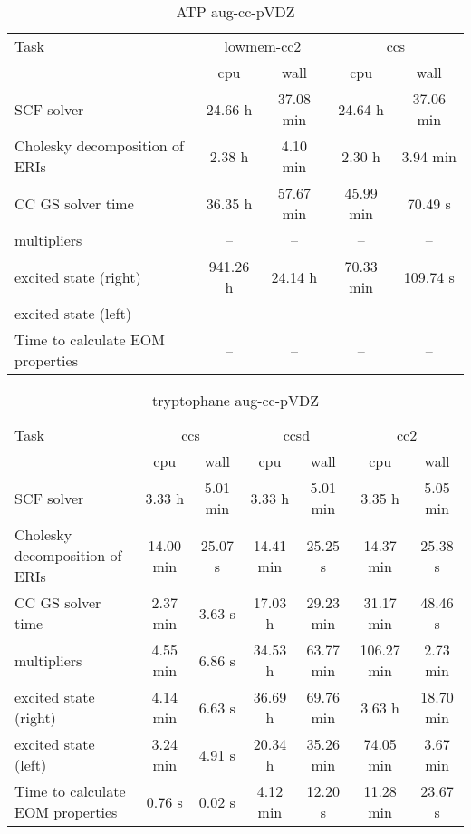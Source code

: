 \documentclass{article}
\begin{document}
\begin{table}
\caption{ATP aug-cc-pVDZ}
\begin{tabular}{lcccc}
\toprule
Task & \multicolumn{2}{c}{lowmem-cc2} & \multicolumn{2}{c}{ccs}\\
\cmidrule(lr){2-3}\cmidrule(lr){4-5}
 & cpu & wall & cpu & wall\\
\midrule
SCF solver & 24.66 h & 37.08 min & 24.64 h & 37.06 min\\
Cholesky decomposition of ERIs & 2.38 h & 4.10 min & 2.30 h & 3.94 min\\
CC GS solver time & 36.35 h & 57.67 min & 45.99 min & 70.49 s\\
multipliers & -- & -- & -- & --\\
excited state (right) & 941.26 h & 24.14 h & 70.33 min & 109.74 s\\
excited state (left) & -- & -- & -- & --\\
Time to calculate EOM properties & -- & -- & -- & --\\
\bottomrule
\end{tabular}
\end{table}
\begin{table}
\caption{tryptophane aug-cc-pVDZ}
\begin{tabular}{lcccccc}
\toprule
Task & \multicolumn{2}{c}{ccs} & \multicolumn{2}{c}{ccsd} & \multicolumn{2}{c}{cc2}\\
\cmidrule(lr){2-3}\cmidrule(lr){4-5}\cmidrule(lr){6-7}
 & cpu & wall & cpu & wall & cpu & wall\\
\midrule
SCF solver & 3.33 h & 5.01 min & 3.33 h & 5.01 min & 3.35 h & 5.05 min\\
Cholesky decomposition of ERIs & 14.00 min & 25.07 s & 14.41 min & 25.25 s & 14.37 min & 25.38 s\\
CC GS solver time & 2.37 min & 3.63 s & 17.03 h & 29.23 min & 31.17 min & 48.46 s\\
multipliers & 4.55 min & 6.86 s & 34.53 h & 63.77 min & 106.27 min & 2.73 min\\
excited state (right) & 4.14 min & 6.63 s & 36.69 h & 69.76 min & 3.63 h & 18.70 min\\
excited state (left) & 3.24 min & 4.91 s & 20.34 h & 35.26 min & 74.05 min & 3.67 min\\
Time to calculate EOM properties & 0.76 s & 0.02 s & 4.12 min & 12.20 s & 11.28 min & 23.67 s\\
\bottomrule
\end{tabular}
\end{table}
\end{document}
